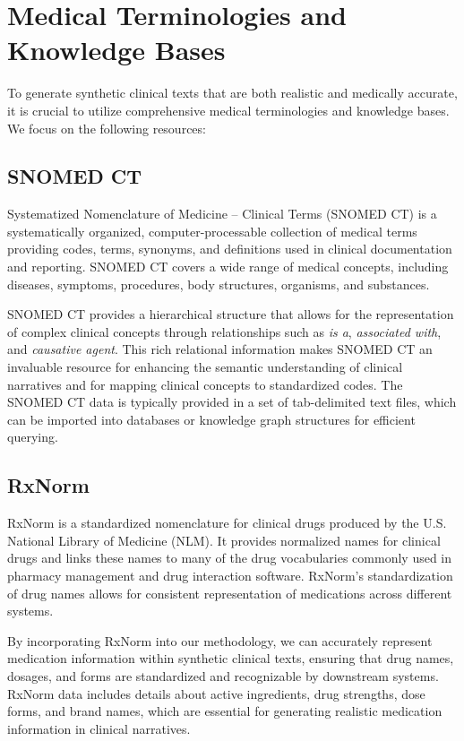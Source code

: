 \documentclass[12pt, a4paper]{article}
\begin{document}
\section{Medical Terminologies and Knowledge Bases}

To generate synthetic clinical texts that are both realistic and medically accurate, it is crucial to utilize comprehensive medical terminologies and knowledge bases. We focus on the following resources:

\subsection{SNOMED CT}

Systematized Nomenclature of Medicine -- Clinical Terms (SNOMED CT) is a systematically organized, computer-processable collection of medical terms providing codes, terms, synonyms, and definitions used in clinical documentation and reporting. SNOMED CT covers a wide range of medical concepts, including diseases, symptoms, procedures, body structures, organisms, and substances.

SNOMED CT provides a hierarchical structure that allows for the representation of complex clinical concepts through relationships such as \textit{is a}, \textit{associated with}, and \textit{causative agent}. This rich relational information makes SNOMED CT an invaluable resource for enhancing the semantic understanding of clinical narratives and for mapping clinical concepts to standardized codes. The SNOMED CT data is typically provided in a set of tab-delimited text files, which can be imported into databases or knowledge graph structures for efficient querying.

\subsection{RxNorm}

RxNorm is a standardized nomenclature for clinical drugs produced by the U.S. National Library of Medicine (NLM). It provides normalized names for clinical drugs and links these names to many of the drug vocabularies commonly used in pharmacy management and drug interaction software. RxNorm's standardization of drug names allows for consistent representation of medications across different systems.

By incorporating RxNorm into our methodology, we can accurately represent medication information within synthetic clinical texts, ensuring that drug names, dosages, and forms are standardized and recognizable by downstream systems. RxNorm data includes details about active ingredients, drug strengths, dose forms, and brand names, which are essential for generating realistic medication information in clinical narratives.
\end{document}
